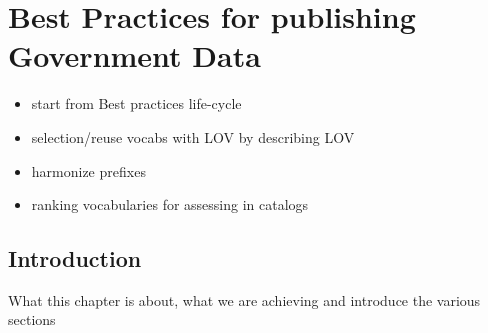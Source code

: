 \chapter{Best Practices for publishing Government Data}
\label{ch:ch6}

\begin{itemize}
\item start from Best practices life-cycle
\item selection/reuse vocabs with LOV by describing LOV
\item harmonize prefixes
\item ranking vocabularies for assessing in catalogs
\end{itemize}


\section{Introduction}
What this chapter is about, what we are achieving and introduce the various sections



